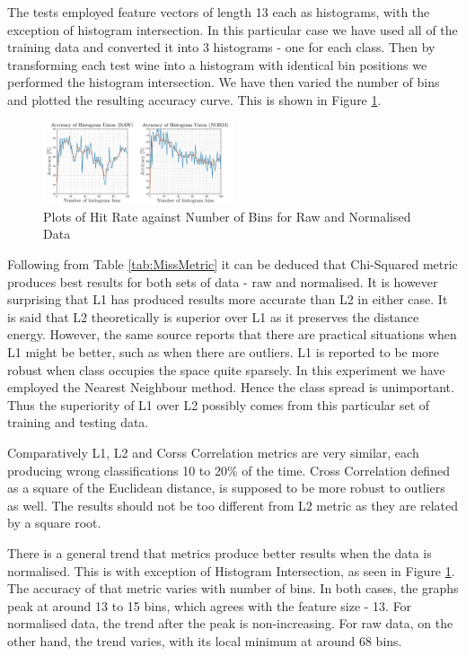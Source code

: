 \documentclass[10pt,twocolumn,letterpaper]{article}
\begin{document}
\vspace{-5mm}

The tests employed feature vectors of length 13 each as histograms, with the exception of histogram intersection. In this particular case we have used all of the training data and converted it into 3 histograms - one for each class. Then by transforming each test wine into a histogram with identical bin positions we performed the histogram intersection. We have then varied the number of bins and plotted the resulting accuracy curve. This is shown in Figure \ref{fig:hist}.

\begin{figure}[H]
\centering
\includegraphics[width=0.5\textwidth]{../results/Q1D_Hist}
\caption{Plots of Hit Rate against Number of Bins for Raw and Normalised Data
\label{fig:hist}}
\end{figure}

Following from Table \ref{tab:MissMetric} it can be deduced that Chi-Squared metric produces best results for both sets of data - raw and normalised. It is however surprising that L1 has produced results more accurate than L2 in either case. It is said \cite{L1L2} that L2 theoretically is superior over L1 as it preserves the distance energy. However, the same source reports that there are practical situations when L1 might be better, such as when there are outliers. L1 is reported to be more robust when class occupies the space quite sparsely. In this experiment we have employed the Nearest Neighbour method. Hence the class spread is unimportant. Thus the superiority of L1 over L2 possibly comes from this particular set of training and testing data.

Comparatively L1, L2 and Corss Correlation metrics are very similar, each producing wrong classifications 10 to 20\% of the time. Cross Correlation defined as a square of the Euclidean distance, is supposed to be more robust to outliers as well. The results should not be too different from L2 metric as they are related by a square root. 

There is a general trend that metrics produce better results when the data is normalised. This is with exception of Histogram Intersection, as seen in Figure \ref{fig:hist}. The accuracy of that metric varies with number of bins. In both cases, the graphs peak at around 13 to 15 bins, which agrees with the feature size - 13.
For normalised data, the trend after the peak is non-increasing. For raw data, on the other hand, the trend varies, with its local minimum at around 68 bins. 
\end{document}
